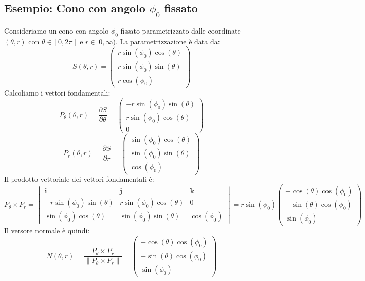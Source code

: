 \subsection{Esempio: Cono con angolo $\phi_0$ fissato}
    Consideriamo un cono con angolo $\phi_0$ fissato parametrizzato dalle coordinate $(\theta, r)$ con $\theta \in [0, 2\pi]$ e $r \in [0, \infty)$. La parametrizzazione è data da:
    \[
    S(\theta, r) = \begin{pmatrix}
      r \sin(\phi_0) \cos(\theta) \\
      r \sin(\phi_0) \sin(\theta) \\
      r \cos(\phi_0)
    \end{pmatrix}
    \]
    Calcoliamo i vettori fondamentali:
    \[
    P_\theta(\theta, r) = \frac{\partial S}{\partial \theta} = \begin{pmatrix}
      -r \sin(\phi_0) \sin(\theta) \\
      r \sin(\phi_0) \cos(\theta) \\
      0
    \end{pmatrix}
    \]
    \[
    P_r(\theta, r) = \frac{\partial S}{\partial r} = \begin{pmatrix}
      \sin(\phi_0) \cos(\theta) \\
      \sin(\phi_0) \sin(\theta) \\
      \cos(\phi_0)
    \end{pmatrix}
    \]
    Il prodotto vettoriale dei vettori fondamentali è:
    \[
    P_\theta \times P_r = \begin{vmatrix}
      \mathbf{i} & \mathbf{j} & \mathbf{k} \\
      -r \sin(\phi_0) \sin(\theta) & r \sin(\phi_0) \cos(\theta) & 0 \\
      \sin(\phi_0) \cos(\theta) & \sin(\phi_0) \sin(\theta) & \cos(\phi_0)
    \end{vmatrix}
    = r \sin(\phi_0) \begin{pmatrix}
      -\cos(\theta) \cos(\phi_0) \\
      -\sin(\theta) \cos(\phi_0) \\
      \sin(\phi_0)
    \end{pmatrix}
    \]
    Il versore normale è quindi:
    \[
    N(\theta, r) = \frac{P_\theta \times P_r}{\|P_\theta \times P_r\|} = \begin{pmatrix}
      -\cos(\theta) \cos(\phi_0) \\
      -\sin(\theta) \cos(\phi_0) \\
      \sin(\phi_0)
    \end{pmatrix}
    \]

